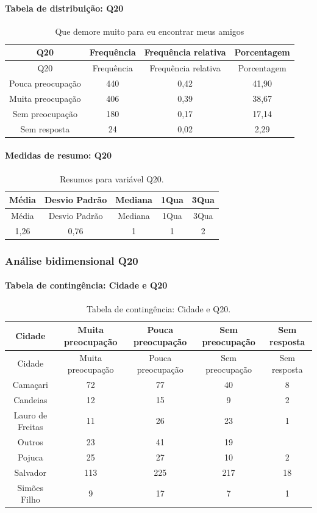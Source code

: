 \documentclass[]{article}
\let\oldparagraph\paragraph
\renewcommand{\paragraph}[1]{\oldparagraph{#1}\mbox{}}
\begin{document}
\hypertarget{tabela-de-distribuiuxe7uxe3o-q20}{%
\paragraph{Tabela de distribuição: Q20}\label{tabela-de-distribuiuxe7uxe3o-q20}}

\begin{longtable}[]{@{}cccc@{}}
\caption{\label{tab:unnamed-chunk-364}Que demore muito para eu encontrar meus amigos}\tabularnewline
\toprule
Q20 & Frequência & Frequência relativa & Porcentagem\tabularnewline
\midrule
\endfirsthead
\toprule
Q20 & Frequência & Frequência relativa & Porcentagem\tabularnewline
\midrule
\endhead
Pouca preocupação & 440 & 0,42 & 41,90\tabularnewline
Muita preocupação & 406 & 0,39 & 38,67\tabularnewline
Sem preocupação & 180 & 0,17 & 17,14\tabularnewline
Sem resposta & 24 & 0,02 & 2,29\tabularnewline
\bottomrule
\end{longtable}

\hypertarget{medidas-de-resumo-q20}{%
\paragraph{Medidas de resumo: Q20}\label{medidas-de-resumo-q20}}

\begin{longtable}[]{@{}ccccc@{}}
\caption{\label{tab:unnamed-chunk-365}Resumos para variável Q20.}\tabularnewline
\toprule
Média & Desvio Padrão & Mediana & 1Qua & 3Qua\tabularnewline
\midrule
\endfirsthead
\toprule
Média & Desvio Padrão & Mediana & 1Qua & 3Qua\tabularnewline
\midrule
\endhead
1,26 & 0,76 & 1 & 1 & 2\tabularnewline
\bottomrule
\end{longtable}

\cleardoublepage

\hypertarget{anuxe1lise-bidimensional-q20}{%
\subsubsection{Análise bidimensional Q20}\label{anuxe1lise-bidimensional-q20}}

\hypertarget{tabela-de-continguxeancia-cidade-e-q20}{%
\paragraph{Tabela de contingência: Cidade e Q20}\label{tabela-de-continguxeancia-cidade-e-q20}}

\begin{longtable}[]{@{}ccccc@{}}
\caption{\label{tab:unnamed-chunk-366}Tabela de contingência: Cidade e Q20.}\tabularnewline
\toprule
Cidade & Muita preocupação & Pouca preocupação & Sem preocupação & Sem resposta\tabularnewline
\midrule
\endfirsthead
\toprule
Cidade & Muita preocupação & Pouca preocupação & Sem preocupação & Sem resposta\tabularnewline
\midrule
\endhead
Camaçari & 72 & 77 & 40 & 8\tabularnewline
Candeias & 12 & 15 & 9 & 2\tabularnewline
Lauro de Freitas & 11 & 26 & 23 & 1\tabularnewline
Outros & 23 & 41 & 19 &\tabularnewline
Pojuca & 25 & 27 & 10 & 2\tabularnewline
Salvador & 113 & 225 & 217 & 18\tabularnewline
Simões Filho & 9 & 17 & 7 & 1\tabularnewline
\bottomrule
\end{longtable}
\end{document}
